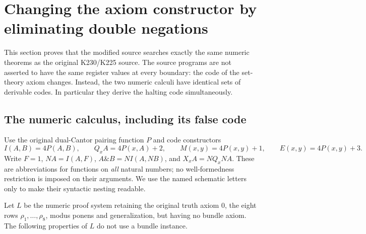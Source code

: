 \section{Changing the axiom constructor by eliminating double negations}
\label{sec:full-dn}

This section proves that the modified source searches exactly the same
numeric theorems as the original K230/K225 source.  The source programs
are not asserted to have the same register values at every boundary:
the code of the set-theory axiom changes.  Instead, the two numeric
calculi have identical sets of derivable codes.  In particular they
derive the halting code simultaneously.

\subsection{The numeric calculus, including its false code}

Use the original dual-Cantor pairing function $P$ and code constructors
\[
 I(A,B)=4P(A,B),\qquad Q_xA=4P(x,A)+2,\qquad
 M(x,y)=4P(x,y)+1,\qquad E(x,y)=4P(x,y)+3.
\]
Write $F=1$, $N A=I(A,F)$,
$A\mathbin{\&}B=N I(A,N B)$, and
$X_x A=NQ_xN A$.  These are abbreviations for functions on
\emph{all} natural numbers; no well-formedness restriction is imposed
on their arguments.  We use the named schematic letters only to make
their syntactic nesting readable.

Let $L$ be the numeric proof system retaining the original truth axiom
$0$, the eight rows $\rho_1,\ldots,\rho_8$, modus ponens and
generalization, but having no bundle axiom.  The following properties
of $L$ do not use a bundle instance.

